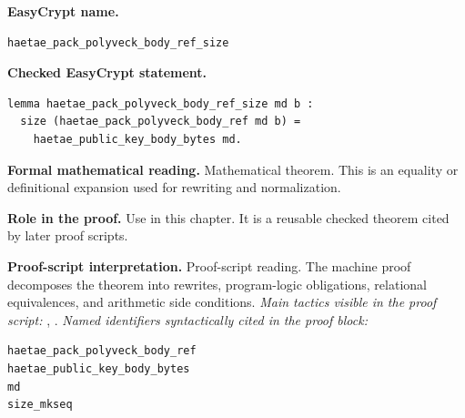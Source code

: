 \begin{formaltheorem}
\noindent\textbf{EasyCrypt name.}
\begin{lstlisting}[language=EasyCrypt,basicstyle=\ttfamily\scriptsize]
haetae_pack_polyveck_body_ref_size
\end{lstlisting}
\noindent\textbf{Checked EasyCrypt statement.}
\begin{lstlisting}[language=EasyCrypt,basicstyle=\ttfamily\scriptsize]
lemma haetae_pack_polyveck_body_ref_size md b :
  size (haetae_pack_polyveck_body_ref md b) =
    haetae_public_key_body_bytes md.
\end{lstlisting}
\noindent\textbf{Formal mathematical reading.}
Mathematical theorem. This is an equality or definitional expansion used for rewriting and normalization.

\noindent\textbf{Role in the proof.}
Use in this chapter. It is a reusable checked theorem cited by later proof scripts.

\noindent\textbf{Proof-script interpretation.}
Proof-script reading. The machine proof decomposes the theorem into rewrites, program-logic obligations, relational equivalences, and arithmetic side conditions.
\emph{Main tactics visible in the proof script:} , .
\emph{Named identifiers syntactically cited in the proof block:}
\begin{lstlisting}[language=EasyCrypt,basicstyle=\ttfamily\scriptsize]
haetae_pack_polyveck_body_ref
haetae_public_key_body_bytes
md
size_mkseq
\end{lstlisting}

\end{formaltheorem}

